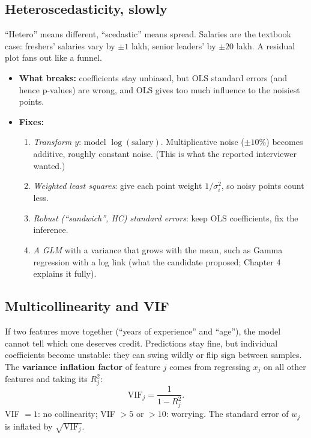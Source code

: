 \subsection{Heteroscedasticity, slowly}
``Hetero'' means different, ``scedastic'' means spread. Salaries are the textbook case: freshers' salaries vary by
$\pm1$ lakh, senior leaders' by $\pm20$ lakh. A residual plot fans out like a funnel.
\begin{itemize}
\item \textbf{What breaks:} coefficients stay unbiased, but OLS standard errors (and hence p-values) are wrong,
  and OLS gives too much influence to the noisiest points.
\item \textbf{Fixes:}
  \begin{enumerate}
  \item \emph{Transform $y$}: model $\log(\text{salary})$. Multiplicative noise ($\pm10\%$) becomes additive,
    roughly constant noise. (This is what the reported interviewer wanted.)
  \item \emph{Weighted least squares}: give each point weight $1/\sigma_i^2$, so noisy points count less.
  \item \emph{Robust (``sandwich'', HC) standard errors}: keep OLS coefficients, fix the inference.
  \item \emph{A GLM} with a variance that grows with the mean, such as Gamma regression with a log link
    (what the candidate proposed; Chapter 4 explains it fully).
  \end{enumerate}
\end{itemize}

\subsection{Multicollinearity and VIF}
If two features move together (``years of experience'' and ``age''), the model cannot tell which one deserves
credit. Predictions stay fine, but individual coefficients become unstable: they can swing wildly or flip sign
between samples. The \textbf{variance inflation factor} of feature $j$ comes from regressing $x_j$ on all other
features and taking its $R_j^2$:
\[ \text{VIF}_j = \frac{1}{1 - R_j^2}. \]
VIF $=1$: no collinearity; VIF $>5$ or $>10$: worrying. The standard error of $w_j$ is inflated by $\sqrt{\text{VIF}_j}$.

